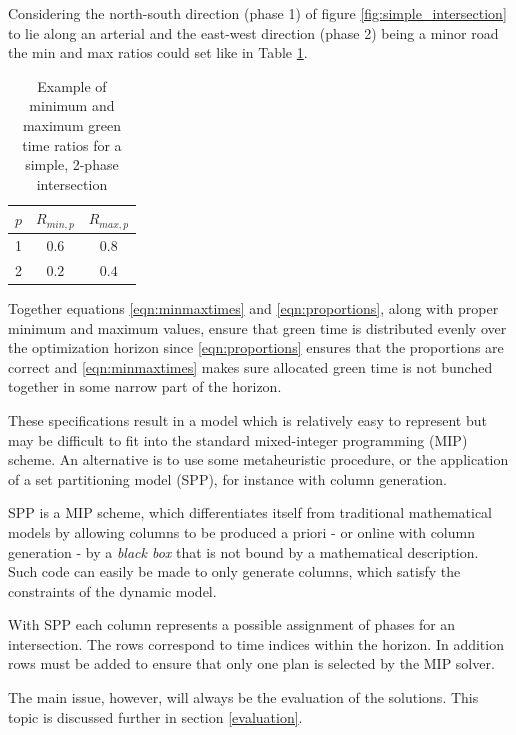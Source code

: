 Considering the north-south direction (phase 1) of figure \ref{fig:simple_intersection} to lie along an arterial and the east-west direction (phase 2) being a minor road the min and max ratios could set like in Table \ref{tbl:minmaxratios}.

\begin{table}[!ht]
\begin{center}
\begin{tabular}{c|c|c}
$p$ & $R_{min,p}$ & $R_{max,p}$ \\ \hline
1 & $0.6$ & $0.8$ \\ 
2 & $0.2$ & $0.4$
\end{tabular}
\end{center}
\caption{Example of minimum and maximum green time ratios for a simple, 2-phase intersection}
\label{tbl:minmaxratios}
\end{table}

Together equations \ref{eqn:minmaxtimes} and \ref{eqn:proportions}, along with proper minimum and maximum values, ensure that green time is distributed evenly over the optimization horizon since \ref{eqn:proportions} ensures that the proportions are correct and \ref{eqn:minmaxtimes} makes sure allocated green time is not bunched together in some narrow part of the horizon.

These specifications result in a model which is relatively easy to represent but may be difficult to fit into the standard mixed-integer programming (MIP) scheme. An alternative is to use some metaheuristic procedure, or the application of a set partitioning model (SPP), for instance with column generation.

SPP is a MIP scheme, which differentiates itself from traditional mathematical models by allowing columns to be produced a priori - or online with column generation - by a \textit{black box} that is not bound by a mathematical description. Such code can easily be made to only generate columns, which satisfy the constraints of the dynamic model.

With SPP each column represents a possible assignment of phases for an intersection. The rows correspond to time indices within the horizon. In addition rows must be added to ensure that only one plan is selected by the MIP solver.

The main issue, however, will always be the evaluation of the solutions. This topic is discussed further in section \ref{evaluation}.